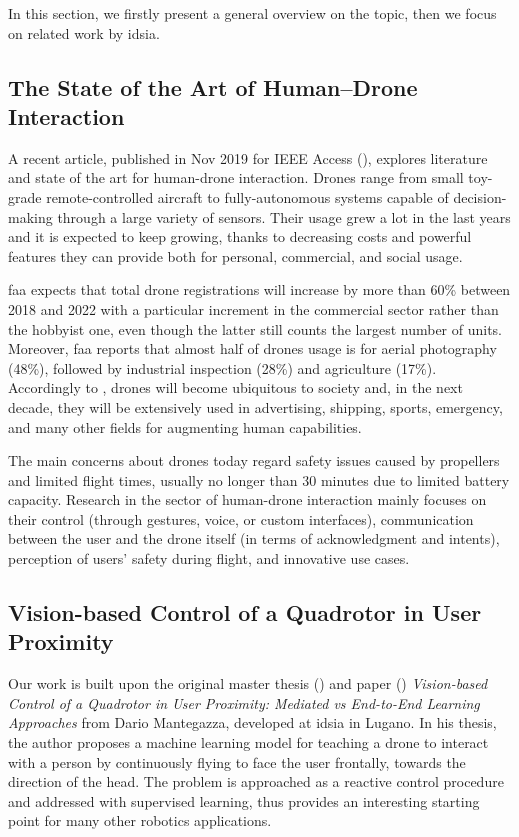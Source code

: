 In this section, we firstly present a general overview on the topic, then we focus on related work by \gls{idsia}.



\subsection{The State of the Art of Human–Drone Interaction}
\label{subsec:human-drone-sota}

A recent article, published in Nov 2019 for IEEE Access (\cite{human-drone-sota}), explores literature and state of the art for human-drone interaction. Drones range from small toy-grade remote-controlled aircraft to fully-autonomous systems capable of decision-making through a large variety of sensors. Their usage grew a lot in the last years and it is expected to keep growing, thanks to decreasing costs and powerful features they can provide both for personal, commercial, and social usage.

\gls{faa} expects that total drone registrations will increase by more than 60\% between 2018 and 2022 with a particular increment in the commercial sector rather than the hobbyist one, even though the latter still counts the largest number of units. Moreover, \gls{faa} reports that almost half of drones usage is for aerial photography (48\%), followed by industrial inspection (28\%) and agriculture (17\%). Accordingly to \cite{human-drone-sota}, drones will become ubiquitous to society and, in the next decade, they will be extensively used in advertising, shipping, sports, emergency, and many other fields for augmenting human capabilities.

The main concerns about drones today regard safety issues caused by propellers and limited flight times, usually no longer than 30 minutes due to limited battery capacity. Research in the sector of human-drone interaction mainly focuses on their control (through gestures, voice, or custom interfaces), communication between the user and the drone itself (in terms of acknowledgment and intents), perception of users' safety during flight, and innovative use cases. 



\subsection{Vision-based Control of a Quadrotor in User Proximity}
\label{subsec:sota-dario}

Our work is built upon the original master thesis (\cite{mantegazza2018thesis}) and paper (\cite{mantegazza2019visionbased}) \textit{Vision-based Control of a Quadrotor in User Proximity: Mediated vs End-to-End Learning Approaches} from Dario Mantegazza, developed at \gls{idsia} in Lugano. In his thesis, the author proposes a machine learning model for teaching a drone to interact with a person by continuously flying to face the user frontally, towards the direction of the head. The problem is approached as a reactive control procedure and addressed with supervised learning, thus provides an interesting starting point for many other robotics applications. 

